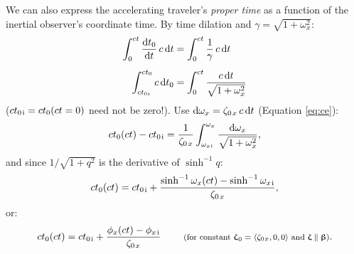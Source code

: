 \documentclass[12pt]{article}
\newcommand{\dd}[1]{\mathrm{d}#1}
\newcommand{\vvbeta}{\bm{\upbeta}}
\newcommand{\vvzeta}{\bm{\upzeta}}
\begin{document}
We can also express the accelerating traveler's \emph{proper time} as a function of the inertial observer's coordinate time. By time dilation and $\gamma = \sqrt{1 + \omega^2_x}$:
\begin{equation*}
\begin{aligned}
\int^{ct}_0 \dfrac{\dd t_0}{\dd t}  \, c \, \dd t &= \int^{ct}_0 \dfrac{1}{\gamma} \, c \, \dd t \\[5pt]
\int^{ct_0}_{ct_{0 \mkern1mu \mathrm{i}}} c \, \dd t_0 &= \int^{ct}_0 \dfrac{c \, \dd t}{\sqrt{1 + \omega^2_x}}
\end{aligned}
\end{equation*}
($ct_{0 \mkern2mu \mathrm{i}} = ct_0 (ct = 0)$ need not be zero!). Use $\dd \omega_x = \zeta_{0 \mkern2mu x} \, c \, \dd t$ (Equation \ref{eq:ce}):
\begin{equation*}
ct_0 (ct) - ct_{0 \mkern2mu \mathrm{i}} = \dfrac{1}{\zeta_{0 \mkern2mu x}} \int^{\omega_x}_{\omega_{x \mkern1mu \textrm{i} }} \dfrac{\dd \omega_x}{\sqrt{1 + \omega^2_x}},
\end{equation*}
and since $1/\sqrt{1 + q^2}$ is the derivative of $\sinh^{-1} q$:
\begin{equation*}
ct_0 (ct) = ct_{0 \mkern2mu \mathrm{i}} + \dfrac{\sinh^{-1} \omega_x (ct) - \sinh^{-1} \omega_{x \mkern2mu \textrm{i} }}{ \zeta_{0 \mkern2mu x}},
\end{equation*}
or:
\begin{equation}\label{eq:pt}
ct_0 (ct) = ct_{0 \mkern2mu \mathrm{i}} + \dfrac{ \phi_x (ct) - \phi_{x \mkern2mu \mathrm{i} }}{ \zeta_{0 \mkern2mu x}}  \qquad \textrm{\footnotesize{ (for constant $\vvzeta_{\mkern1mu 0} = \langle \zeta_{0 \mkern1mu x} , 0, 0 \rangle$ and $\vvzeta \parallel \vvbeta$)}}.
\end{equation}
\end{document}
